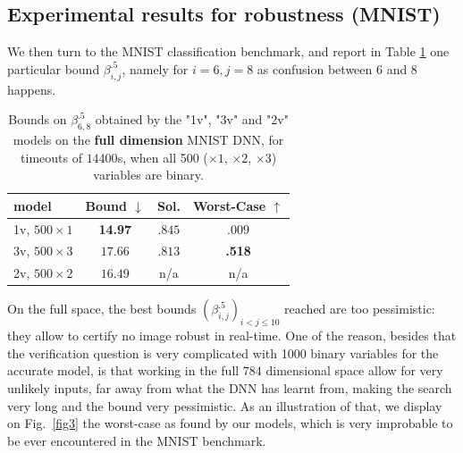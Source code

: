 	\subsection{Experimental results for robustness (MNIST)}
	
We then turn to the MNIST classification benchmark, and report 
in Table \ref{table.mnist} one particular bound $\beta^{.5}_{i,j}$, namely for $i=6,j=8$ as confusion between 6 and 8 happens.
	
	\begin{table}[h!]
		\centering
	\begin{tabular}{||l||c|c|c||}\hline\hline
		model &        Bound $\downarrow$ &  Sol. &      Worst-Case $\uparrow$ \\\hline \hline
		1v, $500 \times 1$ & {\bf 14.97} & $.845$ & $.009$ \\\hline 
		3v, $500 \times 3$ & $17.66$ & $.813$ & {\bf .518} \\\hline 
	    2v, $500 \times 2$ & $16.49$ & n/a & n/a \\\hline\hline	 
	\end{tabular}
	\caption{Bounds on $\beta^{.5}_{6,8}$ 
	obtained by the "1v", "3v" and "2v" models 
	on the {\bf full dimension} MNIST DNN, 
	for timeouts of $14400$s, when all 500 ($\times 1$, $\times 2$, $\times 3$) variables are binary.}
	\label{table.mnist}
\end{table}

On the full space, the best bounds $(\beta^{.5}_{i,j})_{i < j \leq 10}$ reached are too pessimistic: they allow to certify no image robust in real-time. One of the reason, besides that the verification question is very complicated with 1000 binary variables for the accurate model, is that working in the full $784$ dimensional space allow for very unlikely inputs, far away from what the DNN has learnt from, making the search very long and the bound very pessimistic.
As an illustration of that, we display on Fig.~\ref{fig3} the worst-case as found by our models, which is very improbable to be ever encountered in the MNIST benchmark.

